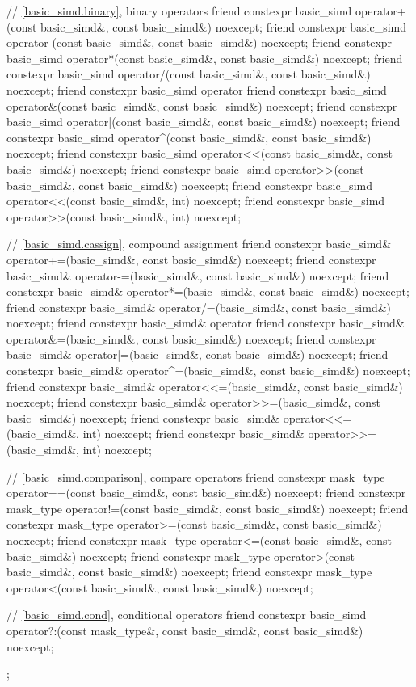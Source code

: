 \begin{codeblock}
{  // \ref{basic_simd.binary},  binary operators
  friend constexpr basic_simd operator+(const basic_simd&, const basic_simd&) noexcept;
  friend constexpr basic_simd operator-(const basic_simd&, const basic_simd&) noexcept;
  friend constexpr basic_simd operator*(const basic_simd&, const basic_simd&) noexcept;
  friend constexpr basic_simd operator/(const basic_simd&, const basic_simd&) noexcept;
  friend constexpr basic_simd operator%
  friend constexpr basic_simd operator&(const basic_simd&, const basic_simd&) noexcept;
  friend constexpr basic_simd operator|(const basic_simd&, const basic_simd&) noexcept;
  friend constexpr basic_simd operator^(const basic_simd&, const basic_simd&) noexcept;
  friend constexpr basic_simd operator<<(const basic_simd&, const basic_simd&) noexcept;
  friend constexpr basic_simd operator>>(const basic_simd&, const basic_simd&) noexcept;
  friend constexpr basic_simd operator<<(const basic_simd&, int) noexcept;
  friend constexpr basic_simd operator>>(const basic_simd&, int) noexcept;

  // \ref{basic_simd.cassign},  compound assignment
  friend constexpr basic_simd& operator+=(basic_simd&, const basic_simd&) noexcept;
  friend constexpr basic_simd& operator-=(basic_simd&, const basic_simd&) noexcept;
  friend constexpr basic_simd& operator*=(basic_simd&, const basic_simd&) noexcept;
  friend constexpr basic_simd& operator/=(basic_simd&, const basic_simd&) noexcept;
  friend constexpr basic_simd& operator%
  friend constexpr basic_simd& operator&=(basic_simd&, const basic_simd&) noexcept;
  friend constexpr basic_simd& operator|=(basic_simd&, const basic_simd&) noexcept;
  friend constexpr basic_simd& operator^=(basic_simd&, const basic_simd&) noexcept;
  friend constexpr basic_simd& operator<<=(basic_simd&, const basic_simd&) noexcept;
  friend constexpr basic_simd& operator>>=(basic_simd&, const basic_simd&) noexcept;
  friend constexpr basic_simd& operator<<=(basic_simd&, int) noexcept;
  friend constexpr basic_simd& operator>>=(basic_simd&, int) noexcept;

  // \ref{basic_simd.comparison},  compare operators
  friend constexpr mask_type operator==(const basic_simd&, const basic_simd&) noexcept;
  friend constexpr mask_type operator!=(const basic_simd&, const basic_simd&) noexcept;
  friend constexpr mask_type operator>=(const basic_simd&, const basic_simd&) noexcept;
  friend constexpr mask_type operator<=(const basic_simd&, const basic_simd&) noexcept;
  friend constexpr mask_type operator>(const basic_simd&, const basic_simd&) noexcept;
  friend constexpr mask_type operator<(const basic_simd&, const basic_simd&) noexcept;

  // \ref{basic_simd.cond},  conditional operators
  friend constexpr basic_simd operator?:(const mask_type&, const basic_simd&, const basic_simd&) noexcept;
};
\end{codeblock}

